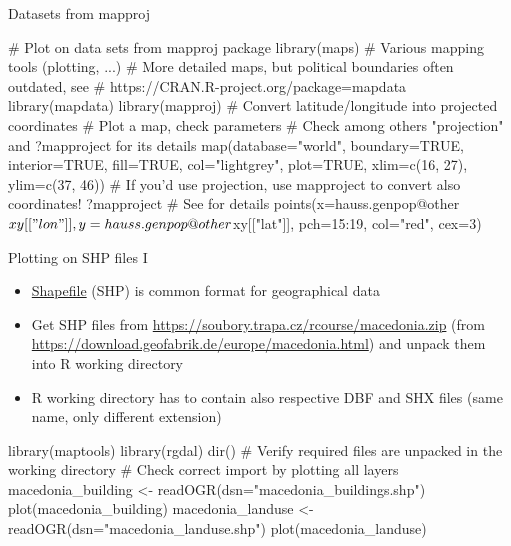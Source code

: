 \documentclass[compress, xelatex, 11pt, xcolor=svgnames, aspectratio=169,
	hyperref={
		bookmarks=true,
		unicode=true,
		colorlinks=true,
		pdftitle={Molecular data in R},
		plainpages=false,
		pdfauthor={Vojtech Zeisek},
		pdfsubject={Course about phylogeny and evolution in R},
		pdfcreator={XeLaTeX},
		pdfkeywords={R, evolution, phylogeny, molecular data},
		linkcolor=Crimson, %
		anchorcolor=Magenta, %
		citecolor=Magenta, %
		filecolor=Magenta, %
		menucolor=Magenta, %
		urlcolor=DodgerBlue, %
		},
	url={hyphens, lowtilde} %
	]{beamer}
\begin{document}
\begin{frame}[fragile]{Datasets from mapproj}
	\begin{spluscode}
    # Plot on data sets from mapproj package
    library(maps) # Various mapping tools (plotting, ...)
    # More detailed maps, but political boundaries often outdated, see
    # https://CRAN.R-project.org/package=mapdata
    library(mapdata)
    library(mapproj)
    # Convert latitude/longitude into projected coordinates
    # Plot a map, check parameters
    # Check among others "projection" and ?mapproject for its details
    map(database="world", boundary=TRUE, interior=TRUE, fill=TRUE,
      col="lightgrey", plot=TRUE, xlim=c(16, 27), ylim=c(37, 46))
    # If you'd use projection, use mapproject to convert also coordinates!
    ?mapproject # See for details
    points(x=hauss.genpop@other$xy[["lon"]], y=hauss.genpop@other$xy[["lat"]],
      pch=15:19, col="red", cex=3)
	\end{spluscode}
\end{frame}

\begin{frame}[fragile]{Plotting on SHP files I}
	\begin{itemize}
		\item \href{https://en.wikipedia.org/wiki/Shapefile}{Shapefile} (SHP) is common format for geographical data
		\item Get SHP files from \url{https://soubory.trapa.cz/rcourse/macedonia.zip} (from \url{https://download.geofabrik.de/europe/macedonia.html}) and unpack them into R working directory
		\item R working directory has to contain also respective DBF and SHX files (same name, only different extension)
	\end{itemize}
	\begin{spluscode}
    library(maptools)
    library(rgdal)
    dir() # Verify required files are unpacked in the working directory
    # Check correct import by plotting all layers
    macedonia_building <- readOGR(dsn="macedonia_buildings.shp")
    plot(macedonia_building)
    macedonia_landuse <- readOGR(dsn="macedonia_landuse.shp")
    plot(macedonia_landuse)
	\end{spluscode}
\end{frame}
\end{document}
